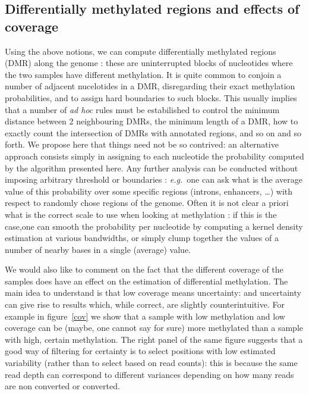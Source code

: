 \documentclass[11pt]{amsart}
\newcommand{\eg}{\textit{e.g.}\ }
\begin{document}
\subsection{Differentially methylated regions and effects of coverage}
Using the above notions, we can compute differentially methylated regions (DMR) along the genome : these are uninterrupted blocks of nucleotides where the two samples have different methylation.
It is quite common to conjoin a number of adjacent nucelotides in a DMR, disregarding their exact methylation probabilities, and to assign hard boundaries to such blocks. This usually implies that a number of \textit{ad hoc} rules must be estabilished to control the minimum distance between 2 neighbouring DMRs, the minimum length of a DMR, how to exactly count the intersection of DMRs with annotated regions, and so on and so forth. We propose here that things need not be so contrived: an alternative approach consists simply in assigning to each nucleotide the probability computed by the algorithm presented here. Any further analysis can be conducted without imposing arbitrary threshold or boundaries : \eg one can ask what is the average value of this probability over some specific regions (introns, enhancers, \dots) with respect to randomly chose regions of the genome. Often it is not clear a priori what is the correct scale to use when looking at methylation : if this is the case,one can smooth the probability per nucleotide by computing a kernel density estimation at various bandwidths, or simply clump together the values of a number of nearby bases in a single (average) value. 

We would also like to comment on the fact that the different coverage of the samples does have an effect on
the estimation of differential methylation. The main idea to understand is that low coverage means uncertainty: and uncertainty can give rise to results which, while correct, are slightly counterintuitive. For example in figure~\ref{cov} we show that a sample with low methylation and low coverage can be (maybe, one cannot say for sure) more methylated than a sample with high, certain methylation. The right panel of the same figure suggests that a good way of filtering for certainty is to select positions with low estimated variability (rather than to select based on read counts): this is because the same read depth can correspond to different variances depending on how many reads are non converted or converted. 
\end{document}

